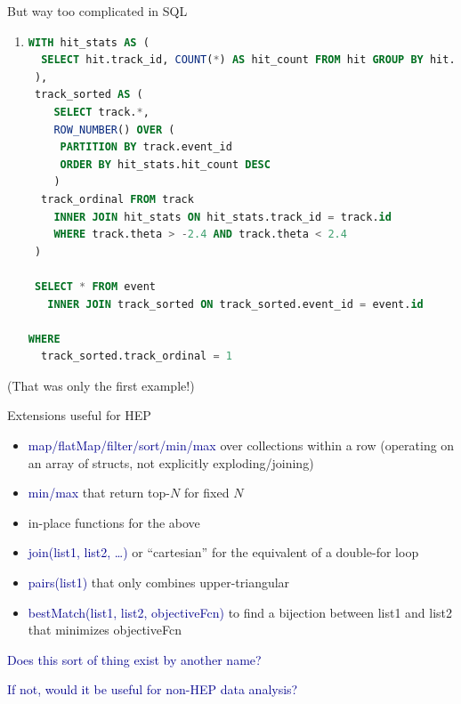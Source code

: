 \documentclass{beamer}
\begin{document}
\begin{frame}[fragile]{But way too complicated in SQL}
\vspace{0.25 cm}
\begin{enumerate}
\item
\begin{lstlisting}[language=sql, basicstyle=\ttfamily\scriptsize]
 WITH hit_stats AS (
  SELECT hit.track_id, COUNT(*) AS hit_count FROM hit GROUP BY hit.track_id
 ),
 track_sorted AS (
    SELECT track.*, 
    ROW_NUMBER() OVER (
     PARTITION BY track.event_id
     ORDER BY hit_stats.hit_count DESC
    )
  track_ordinal FROM track 
    INNER JOIN hit_stats ON hit_stats.track_id = track.id
    WHERE track.theta > -2.4 AND track.theta < 2.4
 )

 SELECT * FROM event
   INNER JOIN track_sorted ON track_sorted.event_id = event.id

WHERE
  track_sorted.track_ordinal = 1
\end{lstlisting}
\end{enumerate}
(That was only the first example!)
\end{frame}

\begin{frame}{Extensions useful for HEP}
\vspace{0.25 cm}
\begin{itemize}
\item \textcolor{darkblue}{map/flatMap/filter/sort/min/max} over collections within a row (operating on an array of structs, not explicitly exploding/joining)
\item \textcolor{darkblue}{min/max} that return top-$N$ for fixed $N$
\item in-place functions for the above
\item \textcolor{darkblue}{join(list1, list2, \ldots)} or ``cartesian'' for the equivalent of a double-for loop
\item \textcolor{darkblue}{pairs(list1)} that only combines upper-triangular
\item \textcolor{darkblue}{bestMatch(list1, list2, objectiveFcn)} to find a bijection between list1 and list2 that minimizes objectiveFcn
\end{itemize}

\vspace{0.5 cm}
\textcolor{darkblue}{Does this sort of thing exist by another name?}

\vspace{0.5 cm}
\textcolor{darkblue}{If not, would it be useful for non-HEP data analysis?}
\end{frame}
\end{document}
